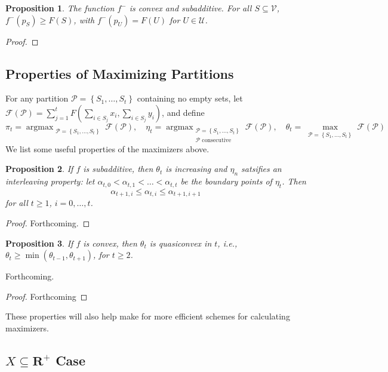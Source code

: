 \documentclass{article}
\newtheorem{prop}{Proposition}
\theoremstyle{case}
\DeclareMathOperator*{\argmax}{argmax} %
\begin{document}
\begin{prop}
The function $f^-$ is convex and subadditive. For all $S \subseteq \mathcal{V}$, $f^-(p_S) \geq F(S)$, with $f^-(p_U) = F(U)$ for $U \in \mathcal{U}$.
\end{prop}
\begin{proof}
\end{proof}



\subsection{Properties of Maximizing Partitions}
For any partition $\mathcal{P} = \left\lbrace S_1, \dots, S_t\right\rbrace$ containing no empty sets, let $\mathcal{F}(\mathcal{P}) = \sum\limits_{j=1}^{t}F( \sum_{i \in S_j}x_i, \sum_{i \in S_j}y_i)$, and define
\[
\pi_t = \argmax_{\substack{\mathcal{P} = \left\lbrace S_1, \dots, S_t\right\rbrace}} {\mathcal{F}(\mathcal{P})}, \quad \eta_t = \argmax_{\substack{\mathcal{P} = \left\lbrace S_1, \dots, S_t\right\rbrace \\ \mathcal{P} \text{ consecutive}}} {\mathcal{F}(\mathcal{P})}, \quad \theta_t = \max_{\substack{\mathcal{P} = \left\lbrace S_1, \dots, S_t\right\rbrace}} {\mathcal{F}(\mathcal{P})}
\]
We list some useful properties of the maximizers above.
\begin{prop}
If $f$ is subadditive, then $\theta_t$ is increasing and $\eta_n$ satsifies an interleaving property: let $\alpha_{t,0} < \alpha_{t,1} < \dots < \alpha_{t,t}$ be the boundary points of $\eta_t$. Then
\[
\alpha_{t+1,i} \leq \alpha_{t,i} \leq \alpha_{t+1,i+1}
\]
for all $t \geq 1$, $i = 0, \dots, t$.
\end{prop}
\begin{proof}
Forthcoming.
\end{proof}
\begin{prop}
If $f$ is convex, then $\theta_t$ is quasiconvex in $t$, i.e., $\theta_t \geq \min{(\theta_{t-1}, \theta_{t+1})}$, for $t \geq 2$.
\end{prop}
Forthcoming.
\begin{proof}
Forthcoming
\end{proof}
These properties will also help make for more efficient schemes for calculating maximizers.

\subsection{$X \subseteq \mathbf{R}^+$ Case}
\end{document}

